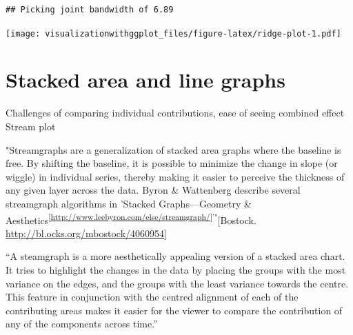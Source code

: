\documentclass[]{krantz}
\begin{document}
\begin{verbatim}
## Picking joint bandwidth of 6.89
\end{verbatim}

\texttt{[image: visualizationwithggplot\_files/figure-latex/ridge-plot-1.pdf]}

\hypertarget{stacked-area-and-line-graphs}{%
\section{Stacked area and line graphs}\label{stacked-area-and-line-graphs}}

Challenges of comparing individual contributions, ease of seeing combined effect
Stream plot

"Streamgraphs are a generalization of stacked area graphs where the baseline is free. By shifting the baseline, it is possible to minimize the change in slope (or wiggle) in individual series, thereby making it easier to perceive the thickness of any given layer across the data. Byron \& Wattenberg describe several streamgraph algorithms in 'Stacked Graphs---Geometry \& Aesthetics\textsuperscript{{[}\url{http://www.leebyron.com/else/streamgraph/}{]}'"}{[}Bostock. \url{http://bl.ocks.org/mbostock/4060954}{]}

``A steamgraph is a more aesthetically appealing version of a stacked area chart. It tries to highlight the changes in the data by placing the groups with the most variance on the edges, and the groups with the least variance towards the centre. This feature in conjunction with the centred alignment of each of the contributing areas makes it easier for the viewer to compare the contribution of any of the components across time.''
\end{document}
